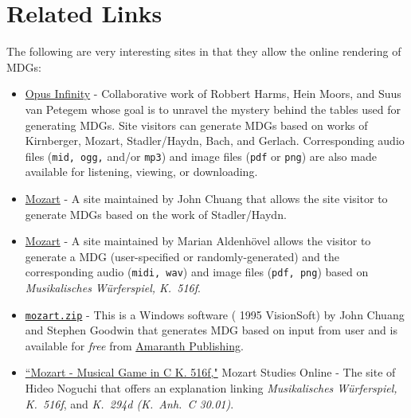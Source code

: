 \documentclass[a4paper,x11names,svgnames,10pt]{article}
\begin{document}
{%
\section{Related Links}
The following are very interesting sites in that they allow the online rendering of MDGs:
\begin{itemize}
	\item \href{https://opus-infinity.org}{Opus Infinity} - Collaborative work of Robbert Harms, Hein Moors, and Suus van Petegem whose goal is to unravel the mystery behind the tables used for generating MDGs.  Site visitors can generate MDGs based on works of Kirnberger, Mozart, Stadler/Haydn, Bach, and Gerlach.  Corresponding audio files ({\tt mid, ogg,} and/or {\tt mp3}) and image files ({\tt pdf} or {\tt png}) are also made available for listening, viewing, or downloading.
	
	\item  \href{http://sunsite.univie.ac.at/Mozart/dice/}{Mozart} - A site maintained by John Chuang that allows the site visitor to generate MDGs based on the work of Stadler/Haydn.
	
	\item  \href{https://marian-aldenhoevel.de/mozart/}{Mozart} - A site maintained by Marian Aldenh\"{o}vel allows the visitor to generate a MDG (user-specified or randomly-generated) and the corresponding audio ({\tt midi, wav}) and image files ({\tt pdf, png}) based on {\em Musikalisches W\"{u}rferspiel, K.\ 516f}.
	
	\item \href{https://www.amaranthpublishing.com/mozart.zip}{\tt mozart.zip} -  This is a Windows software ({\small\textcopyright} 1995 VisionSoft) by John Chuang and Stephen Goodwin that generates MDG based on input from user and is available for {\it free} from  \href{http://www.amaranthpublishing.com/MozartDiceGame.htm}{Amaranth Publishing}.  
	
	\item \href{(http://www.asahi-net.or.jp/\~rb5h-ngc/e/k516f.htm}{``Mozart - Musical Game in C K. 516f,"}	Mozart Studies Online - The site of Hideo Noguchi that offers an explanation linking {\em Musikalisches W\"{u}rferspiel, K.\ 516f}, and  {\em K.\ 294d (K.\ Anh.\ C 30.01)}. 
\end{itemize}

\newpage
}
\end{document}
